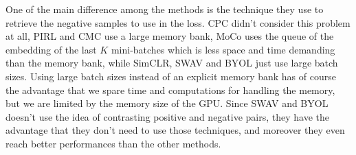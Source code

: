One of the main difference among the methods is the technique they use to retrieve the negative samples to use in the loss. CPC didn't consider this problem at all, PIRL and CMC use a large memory bank, MoCo uses the queue of the embedding of the last $K$ mini-batches which is less space and time demanding than the memory bank, while SimCLR, SWAV and BYOL just use large batch sizes. Using large batch sizes instead of an explicit memory bank has of course the advantage that we spare time and computations for handling the memory, but we are limited by the memory size of the GPU. Since SWAV and BYOL doesn't use the idea of contrasting positive and negative pairs, they have the advantage that they don't need to use those techniques, and moreover they even reach better performances than the other methods.
